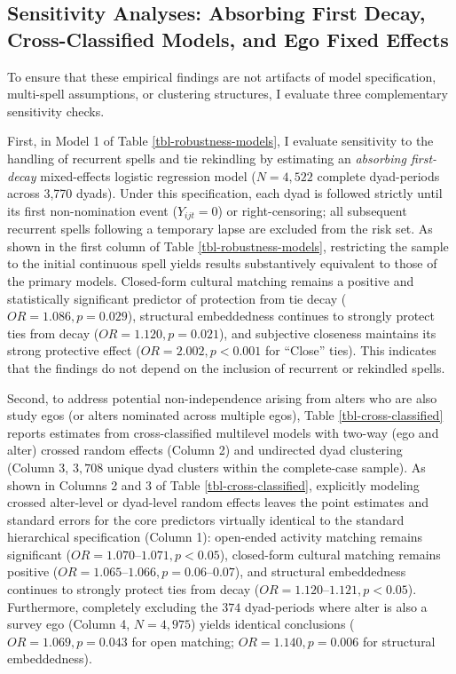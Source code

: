 \documentclass[12pt,letterpaper]{article}
\begin{document}
\subsection{Sensitivity Analyses: Absorbing First Decay, Cross-Classified Models, and Ego Fixed Effects}\label{robustness-check}

To ensure that these empirical findings are not artifacts of model specification, multi-spell assumptions, or clustering structures, I evaluate three complementary sensitivity checks.

First, in Model 1 of Table \ref{tbl-robustness-models}, I evaluate sensitivity to the handling of recurrent spells and tie rekindling by estimating an \textit{absorbing first-decay} mixed-effects logistic regression model ($N = 4,522$ complete dyad-periods across 3,770 dyads). Under this specification, each dyad is followed strictly until its first non-nomination event ($Y_{ijt} = 0$) or right-censoring; all subsequent recurrent spells following a temporary lapse are excluded from the risk set. As shown in the first column of Table \ref{tbl-robustness-models}, restricting the sample to the initial continuous spell yields results substantively equivalent to those of the primary models. Closed-form cultural matching remains a positive and statistically significant predictor of protection from tie decay ($OR = 1.086, p = 0.029$), structural embeddedness continues to strongly protect ties from decay ($OR = 1.120, p = 0.021$), and subjective closeness maintains its strong protective effect ($OR = 2.002, p < 0.001$ for ``Close'' ties). This indicates that the findings do not depend on the inclusion of recurrent or rekindled spells.

Second, to address potential non-independence arising from alters who are also study egos (or alters nominated across multiple egos), Table \ref{tbl-cross-classified} reports estimates from cross-classified multilevel models with two-way (ego and alter) crossed random effects (Column 2) and undirected dyad clustering (Column 3, $3,708$ unique dyad clusters within the complete-case sample). As shown in Columns 2 and 3 of Table \ref{tbl-cross-classified}, explicitly modeling crossed alter-level or dyad-level random effects leaves the point estimates and standard errors for the core predictors virtually identical to the standard hierarchical specification (Column 1): open-ended activity matching remains significant ($OR = 1.070\text{--}1.071, p < 0.05$), closed-form cultural matching remains positive ($OR = 1.065\text{--}1.066, p = 0.06\text{--}0.07$), and structural embeddedness continues to strongly protect ties from decay ($OR = 1.120\text{--}1.121, p < 0.05$). Furthermore, completely excluding the $374$ dyad-periods where alter is also a survey ego (Column 4, $N = 4,975$) yields identical conclusions ($OR = 1.069, p = 0.043$ for open matching; $OR = 1.140, p = 0.006$ for structural embeddedness).
\end{document}

